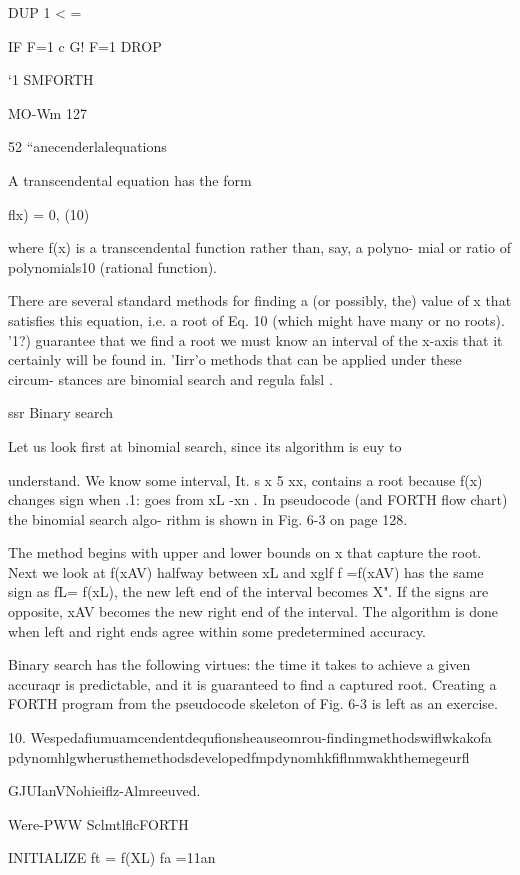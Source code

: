 {DUP 1 < =

IF F=1 c G! F=1 DROP

 

‘1 SMFORTH

MO-Wm 127

52 “anecenderlalequations

A transcendental equation has the form

ﬂx) = 0, (10)

where f(x) is a transcendental function rather than, say, a polyno-
mial or ratio of polynomials10 (rational function).

There are several standard methods for ﬁnding a (or possibly, the)
value of x that satisﬁes this equation, i.e. a root of Eq. 10 (which
might have many or no roots). '1?) guarantee that we ﬁnd a root
we must know an interval of the x-axis that it certainly will be
found in. 'Iirr'o methods that can be applied under these circum-
stances are binomial search and regula falsl .

ssr Binary search

Let us look ﬁrst at binomial search, since its algorithm is euy to

understand. We know some interval, It. s x 5 xx, contains a
root because f(x) changes sign when .1: goes from xL -xn . In
pseudocode (and FORTH ﬂow chart) the binomial search algo-
rithm is shown in Fig. 6-3 on page 128.

The method begins with upper and lower bounds on x that capture
the root. Next we look at f(xAV) halfway between xL and xglf
f =f(xAV) has the same sign as fL= f(xL), the new left end of the
interval becomes X". If the signs are opposite, xAV becomes the
new right end of the interval. The algorithm is done when left and
right ends agree within some predetermined accuracy.

Binary search has the following virtues: the time it takes to
achieve a given accuraqr is predictable, and it is guaranteed to
ﬁnd a captured root. Creating a FORTH program from the
pseudocode skeleton of Fig. 6-3 is left as an exercise.

 

10. Wespedaﬁumuamcendentdequﬁonsheauseomrou-ﬁndingmethodswiﬂwkakofa
pdynomhlgwherusthemethodsdevelopedfmpdynomhkﬁﬂnmwakhthemegeurﬂ

GJUIanVNohieiﬂz-Almreeuved.

Were-PWW SclmtlﬂcFORTH

 

INITIALIZE
ft = f(XL) fa =11an

}
